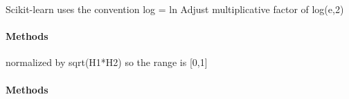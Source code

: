\documentclass[letterpaper,10pt,english]{sphinxmanual}
\begin{document}

\begin{fulllineitems}
\label{index:halla.distance.MutualInformation}
Scikit-learn uses the convention log = ln
Adjust multiplicative factor of log(e,2)
\paragraph{Methods}

\end{fulllineitems}


\begin{fulllineitems}
\label{index:halla.distance.NormalizedMutualInformation}
normalized by sqrt(H1*H2) so the range is {[}0,1{]}
\paragraph{Methods}

\end{fulllineitems}

\end{document}
